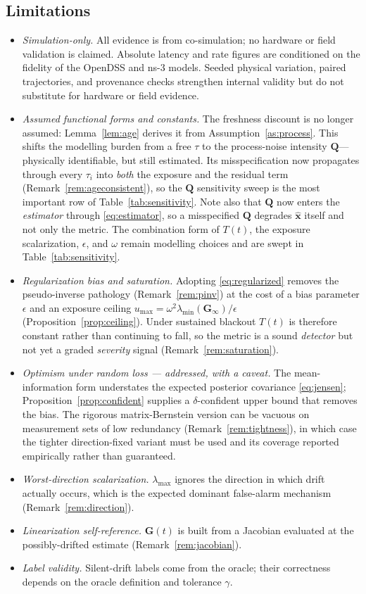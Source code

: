 \documentclass[journal]{IEEEtran}
\theoremstyle{plain}
\theoremstyle{definition}
\theoremstyle{remark}
\newcommand{\bxh}{\hat{\mathbf{x}}}
\newcommand{\bG}{\mathbf{G}}
\newcommand{\lmax}{\lambda_{\max}}
\newcommand{\lmin}{\lambda_{\min}}
\newcommand{\bQ}{\mathbf{Q}}
\begin{document}
\subsection{Limitations}
\begin{itemize}
\item \emph{Simulation-only.} All evidence is from co-simulation; no
hardware or field validation is claimed. Absolute latency and rate figures
are conditioned on the fidelity of the OpenDSS and ns-3 models. Seeded
physical variation, paired trajectories, and provenance checks strengthen
internal validity but do not substitute for hardware or field evidence.
\item \emph{Assumed functional forms and constants.} The freshness
discount is no longer assumed: Lemma~\ref{lem:age} derives it from
Assumption~\ref{as:process}. This shifts the modelling burden from a free
$\tau$ to the process-noise intensity $\bQ$---physically identifiable, but
still estimated. Its misspecification now propagates through every
$\tau_i$ into \emph{both} the exposure and the residual term
(Remark~\ref{rem:ageconsistent}), so the $\bQ$ sensitivity sweep is the
most important row of Table~\ref{tab:sensitivity}. Note also that $\bQ$
now enters the \emph{estimator} through \eqref{eq:estimator}, so a
misspecified $\bQ$ degrades $\bxh$ itself and not only the metric. The combination form of $T(t)$, the exposure scalarization,
$\epsilon$, and $\omega$ remain modelling choices and are swept in
Table~\ref{tab:sensitivity}.
\item \emph{Regularization bias and saturation.} Adopting
\eqref{eq:regularized} removes the pseudo-inverse pathology
(Remark~\ref{rem:pinv}) at the cost of a bias parameter $\epsilon$ and an
exposure ceiling $u_{\max}=\omega^{2}\lmin(\bG_{\infty})/\epsilon$
(Proposition~\ref{prop:ceiling}). Under sustained blackout $T(t)$ is
therefore constant rather than continuing to fall, so the metric is a
sound \emph{detector} but not yet a graded \emph{severity} signal
(Remark~\ref{rem:saturation}).
\item \emph{Optimism under random loss --- addressed, with a caveat.}
The mean-information form understates the expected posterior covariance
\eqref{eq:jensen}; Proposition~\ref{prop:confident} supplies a
$\delta$-confident upper bound that removes the bias. The rigorous
matrix-Bernstein version can be vacuous on measurement sets of low
redundancy (Remark~\ref{rem:tightness}), in which case the tighter
direction-fixed variant must be used and its coverage reported
empirically rather than guaranteed.
\item \emph{Worst-direction scalarization.} $\lmax$ ignores the direction
in which drift actually occurs, which is the expected dominant
false-alarm mechanism (Remark~\ref{rem:direction}).
\item \emph{Linearization self-reference.} $\bG(t)$ is built from a
Jacobian evaluated at the possibly-drifted estimate
(Remark~\ref{rem:jacobian}).
\item \emph{Label validity.} Silent-drift labels come from the oracle;
their correctness depends on the oracle definition and tolerance $\gamma$.
\end{itemize}
\end{document}

